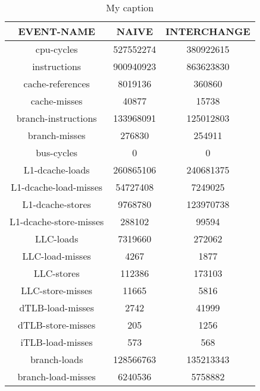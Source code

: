 \begin{table}[]
\centering
\caption{My caption}
\label{my-label}
\begin{tabular}{|c|c|c|}
\hline
\textbf{EVENT-NAME}    & \textbf{NAIVE} & \textbf{INTERCHANGE} \\ \hline
cpu-cycles             & 527552274      & 380922615            \\ \hline
instructions           & 900940923      & 863623830            \\ \hline
cache-references       & 8019136        & 360860               \\ \hline
cache-misses           & 40877          & 15738                \\ \hline
branch-instructions    & 133968091      & 125012803            \\ \hline
branch-misses          & 276830         & 254911               \\ \hline
bus-cycles             & 0              & 0                    \\ \hline
L1-dcache-loads        & 260865106      & 240681375            \\ \hline
L1-dcache-load-misses  & 54727408       & 7249025              \\ \hline
L1-dcache-stores       & 9768780        & 123970738            \\ \hline
L1-dcache-store-misses & 288102         & 99594                \\ \hline
LLC-loads              & 7319660        & 272062               \\ \hline
LLC-load-misses        & 4267           & 1877                 \\ \hline
LLC-stores             & 112386         & 173103               \\ \hline
LLC-store-misses       & 11665          & 5816                 \\ \hline
dTLB-load-misses       & 2742           & 41999                \\ \hline
dTLB-store-misses      & 205            & 1256                 \\ \hline
iTLB-load-misses       & 573            & 568                  \\ \hline
branch-loads           & 128566763      & 135213343            \\ \hline
branch-load-misses     & 6240536        & 5758882              \\ \hline
\end{tabular}
\end{table}
